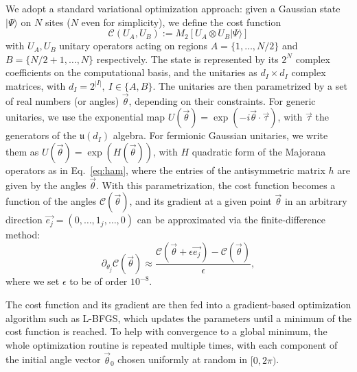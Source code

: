 \documentclass[prx,twocolumn,superscriptaddress,aps,10pt, frontmatterverbose, reprint,footinbib,longbibliography=true]{revtex4-2}
\begin{document}
We adopt a standard variational optimization approach: given a Gaussian state $|\Psi\rangle$ on $N$ sites ($N$ even for simplicity), we define the cost function
\begin{equation}
    \mathcal{C}(U_A, U_B) := M_2\left[U_A \otimes U_B |\Psi \rangle \right]
    \label{eq:cost_function}
\end{equation}
with $U_A, U_B$ unitary operators acting on regions $A=\{1, \ldots, {N/2}\}$ and $B=\{{N/2+1}, \ldots, N\}$ respectively. The state is represented by its $2^N$ complex coefficients on the computational basis, and the unitaries as $d_I \times d_I$ complex matrices, with $d_I=2^{|I|}, \ I \in\{A,B\}$. The unitaries are then parametrized by a set of real numbers (or angles) $\vec{\theta}$, depending on their constraints. For generic unitaries, we use the exponential map $U(\vec{\theta})=\exp(-i\vec{\theta} \cdot \vec{\tau})$, with $\vec{\tau}$ the generators of the $\mathfrak{u}(d_{I})$ algebra. For fermionic Gaussian unitaries, we write them as $U(\vec{\theta})=\exp(H(\vec{\theta}))$, with $H$ quadratic form of the Majorana operators as in Eq.~\eqref{eq:ham}, where the entries of the antisymmetric matrix $h$ are given by the angles $\vec{\theta}$. With this parametrization, the cost function becomes a function of the angles $\mathcal{C}(\vec{\theta})$, and its gradient at a given point $\vec{\theta}$ in an arbitrary direction $\vec{e_j}=(0,\ldots,1_j,\ldots,0)$ can be approximated via the finite-difference method:
\begin{equation}
    \partial_{\theta_j}\mathcal{C}(\vec{\theta}) \approx \frac{\mathcal{C}(\vec{\theta}+\epsilon\vec{e_j}) - \mathcal{C}(\vec{\theta})}{ \epsilon},
\end{equation} 
where we set $\epsilon$ to be of order $10^{-8}$.

The cost function and its gradient are then fed into a gradient-based optimization algorithm such as L-BFGS, which updates the parameters until a minimum of the cost function is reached. To help with convergence to a global minimum, the whole optimization routine is repeated multiple times, with each component of the initial angle vector $\vec{\theta}_0$  chosen uniformly at random in $[0,2\pi)$.
\end{document}
